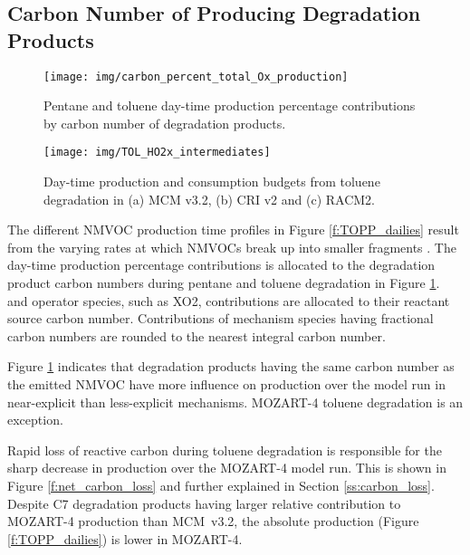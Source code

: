 
\subsection[Carbon Number of Ox Producing Degradation Products]{Carbon Number of  Producing Degradation Products} \label{ss:c_number} %

\begin{figure}
    \centering
    \texttt{[image: img/carbon\_percent\_total\_Ox\_production]}
    \vspace{0mm}
    \caption{Pentane and toluene day-time  production percentage contributions by carbon number of degradation products.}
    \vspace{-4mm}
    \label{f:percent_carbon}
\end{figure}

\begin{figure}
    \centering
    \texttt{[image: img/TOL\_HO2x\_intermediates]}
    \vspace{0mm}
    \caption{Day-time  production and consumption budgets from toluene degradation in (a) MCM v3.2, (b) CRI v2 and (c) RACM2.}
    \vspace{-4mm}
    \label{f:toluene_HO2x}
\end{figure} 

The different NMVOC  production time profiles in Figure \ref{f:TOPP_dailies} result from the varying rates at which NMVOCs break up into smaller fragments \citep{Butler:2011}.
The day-time  production percentage contributions is allocated to the degradation product carbon numbers during pentane and toluene degradation in Figure \ref{f:percent_carbon}.
 and operator species, such as XO2, contributions are allocated to their reactant source carbon number.
Contributions of mechanism species having fractional carbon numbers are rounded to the nearest integral carbon number. 

Figure \ref{f:percent_carbon} indicates that degradation products having the same carbon number as the emitted NMVOC have more influence on  production over the model run in near-explicit than less-explicit mechanisms.
MOZART-4 toluene degradation is an exception.

Rapid loss of reactive carbon during toluene degradation is responsible for the sharp decrease in  production over the MOZART-4 model run.
This is shown in Figure \ref{f:net_carbon_loss} and further explained in Section \ref{ss:carbon_loss}.
Despite C7 degradation products having larger relative contribution to MOZART-4  production than \mbox{MCM v3.2}, the absolute  production (Figure \ref{f:TOPP_dailies}) is lower in MOZART-4.

